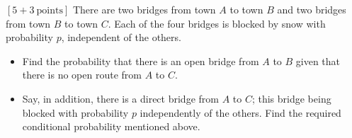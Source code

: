 \documentclass[12pt]{article}
\begin{document}
    \begin{question}
        $[5+3 \: \text{points}]$ There are two bridges from town $A$ to town $B$ and two bridges from town $B$ to town $C$. Each of the four bridges is blocked by snow with probability $p$, independent of the others.
        \begin{itemize}
            \item Find the probability that there is an open bridge from $A$ to $B$ given that there is no open route from $A$ to $C$.
            \item Say, in addition, there is a direct bridge from $A$ to $C$; this bridge being blocked with probability $p$ independently of the others. Find the required conditional probability mentioned above.
        \end{itemize}
    \end{question}
\end{document}
